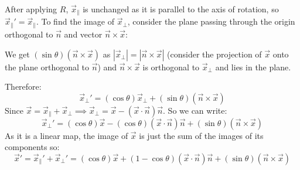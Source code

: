 \documentclass[../main.tex]{subfiles}
\begin{document}
After applying $R$, $\vec{x}_{\parallel}$ is unchanged as it is parallel to the axis of rotation, so $\vec{x}_{\parallel}' = \vec{x}_{\parallel}$.
To find the image of $\vec{x}_{\perp}$, consider the plane passing through the origin orthogonal to $\vec{n}$ and vector $\vec{n} \times \vec{x}$:
\begin{center}
\end{center}
We get $(\sin \theta)(\vec{n} \times \vec{x})$ as $|\vec{x}_{\perp}| = |\vec{n} \times \vec{x}|$ (consider the projection of $\vec{x}$ onto the plane orthogonal to $\vec{n}$) and $\vec{n} \times \vec{x}$ is orthogonal to $\vec{x}_{\perp}$ and lies in the plane.

Therefore:
\[
  \vec{x}_{\perp}' = (\cos \theta)\vec{x}_{\perp} + (\sin \theta)(\vec{n} \times \vec{x})
\]
Since $\vec{x} = \vec{x}_{\parallel} + \vec{x}_{\perp} \implies \vec{x}_{\perp} = \vec{x} - (\vec{x} \cdot \vec{n})\vec{n}$.
So we can write:
\[
  \vec{x}_{\perp}' = (\cos \theta)\vec{x} - (\cos \theta)(\vec{x} \cdot \vec{n})\vec{n} + (\sin \theta)(\vec{n} \times \vec{x})
\]
As it is a linear map, the image of $\vec{x}$ is just the sum of the images of its components so:
\[
  \vec{x}' = \vec{x}_{\parallel}' + \vec{x}_{\perp}' = (\cos \theta)\vec{x} + (1 - \cos\theta)(\vec{x} \cdot \vec{n})\vec{n} + (\sin \theta)(\vec{n} \times \vec{x})
\]
\end{document}

